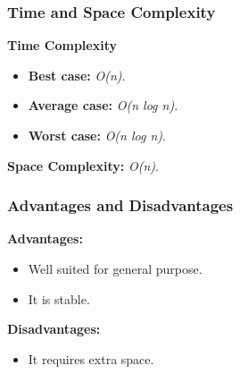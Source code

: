 \subsubsection*{Time and Space Complexity}

\textbf{Time Complexity}

\begin{itemize}
  \item \textbf{Best case:} \textit{O(n)}.
  \item \textbf{Average case:} \emph{O(n log n)}.
  \item \textbf{Worst case:} \textit{O(n log n)}.
\end{itemize}

\textbf{Space Complexity:} \textit{O(n)}.

\subsubsection*{Advantages and Disadvantages}

\textbf{Advantages:}

\begin{itemize}
  \item Well suited for general purpose.
  \item It is stable.
\end{itemize}

\textbf{Disadvantages:}

\begin{itemize}
  \item It requires extra space.
\end{itemize}
